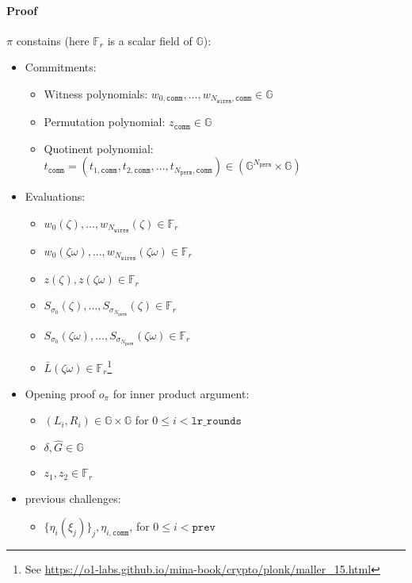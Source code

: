 \paragraph{Proof}
\label{paragraph:proof}
$\pi$ constains (here $\mathbb{F}_r$ is a scalar field of $\mathbb{G}$):
\begin{itemize}
    \label{proof-state}
    \item Commitments:
    \begin{itemize}
        \item Witness polynomials: $w_{0, \texttt{comm}}, ..., w_{N_{\texttt{wires}}, \texttt{comm}} \in \mathbb{G}$
        \item Permutation polynomial: $z_{\texttt{comm}} \in \mathbb{G}$
        \item Quotinent polynomial: $t_{\texttt{comm}} = (t_{1, \texttt{comm}}, t_{2, \texttt{comm}}, ...,  t_{N_{\texttt{perm}}, \texttt{comm}}) \in (\mathbb{G}^{N_{\texttt{perm}}} \times \mathbb{G})$
    \end{itemize}
    \item Evaluations:
    \begin{itemize}
        \item $w_0(\zeta), ..., w_{N_{\texttt{wires}}}(\zeta) \in \mathbb{F}_r$
        \item $w_0(\zeta\omega), ..., w_{N_{\texttt{wires}}}(\zeta\omega) \in \mathbb{F}_r$
        \item $z(\zeta), z(\zeta\omega) \in \mathbb{F}_r$
        \item $S_{\sigma_0}(\zeta), ...,S_{\sigma_{N_{\texttt{perm}}}}(\zeta) \in \mathbb{F}_r$
        \item $S_{\sigma_0}(\zeta\omega), ..., S_{\sigma_{N_{\texttt{perm}}}}(\zeta\omega) \in \mathbb{F}_r$
        \item $\bar{L}(\zeta\omega) \in \mathbb{F}_r$\footnote{See \url{https://o1-labs.github.io/mina-book/crypto/plonk/maller_15.html}}
    \end{itemize}
    \item Opening proof $o_\pi$ for inner product argument:
    \begin{itemize}
        \item $(L_i, R_i) \in \mathbb{G} \times \mathbb{G}$ for $0 \leq i < \texttt{lr\_rounds}$ %
        \item $\delta, \hat{G} \in \mathbb{G}$
        \item $z_1, z_2 \in \mathbb{F}_{r}$
    \end{itemize}
    \item previous challenges:
    \begin{itemize}
        \item $\{\eta_i(\xi_j)\}_{j}, \eta_{i, \texttt{comm}}$, for $0 \leq i < \texttt{prev}$
    \end{itemize}
\end{itemize}

